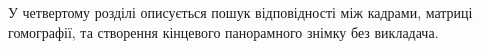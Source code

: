 У четвертому розділі описується пошук відповідності між кадрами,
матриці гомографії, та створення кінцевого панорамного
знімку без викладача.